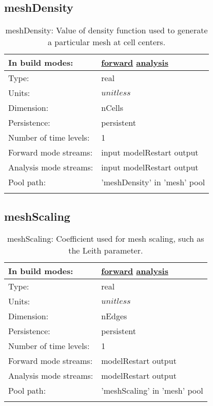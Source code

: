 \subsection[meshDensity]{meshDensity}
\label{subsec:var_sec_mesh_meshDensity}
\begin{center}
\begin{longtable}{| p{2.0in} | p{4.0in} |}
        \hline 
        In build modes: & \hyperref[subsec:forward_var_tab_mesh]{forward} \hyperref[subsec:analysis_var_tab_mesh]{analysis} \\
        \hline 
        Type: & real \\
        \hline 
        Units: & $unitless$ \\
        \hline 
        Dimension: & nCells \\
        \hline 
        Persistence: & persistent \\
        \hline 
        Number of time levels: & 1 \\
        \hline 
		 Forward mode streams: &  input modelRestart output \\
        \hline 
		 Analysis mode streams: &  input modelRestart output \\
        \hline 
            Pool path: & 'meshDensity' in 'mesh' pool
 \\
		 \hline 
    \caption{meshDensity: Value of density function used to generate a particular mesh at cell centers.}
\end{longtable}
\end{center}
\subsection[meshScaling]{meshScaling}
\label{subsec:var_sec_mesh_meshScaling}
\begin{center}
\begin{longtable}{| p{2.0in} | p{4.0in} |}
        \hline 
        In build modes: & \hyperref[subsec:forward_var_tab_mesh]{forward} \hyperref[subsec:analysis_var_tab_mesh]{analysis} \\
        \hline 
        Type: & real \\
        \hline 
        Units: & $unitless$ \\
        \hline 
        Dimension: & nEdges \\
        \hline 
        Persistence: & persistent \\
        \hline 
        Number of time levels: & 1 \\
        \hline 
		 Forward mode streams: &  modelRestart output \\
        \hline 
		 Analysis mode streams: &  modelRestart output \\
        \hline 
            Pool path: & 'meshScaling' in 'mesh' pool
 \\
		 \hline 
    \caption{meshScaling: Coefficient used for mesh scaling, such as the Leith parameter.}
\end{longtable}
\end{center}
